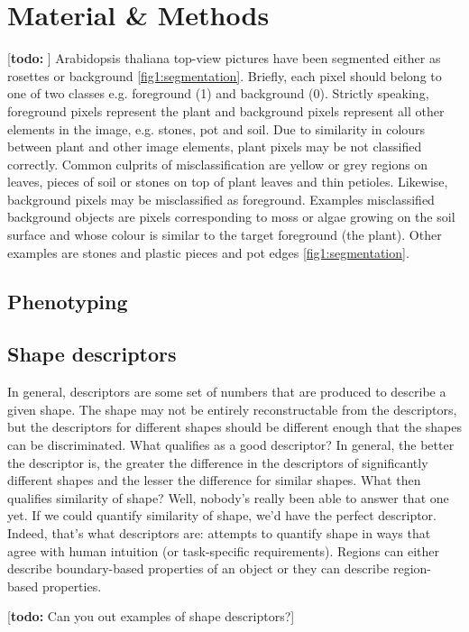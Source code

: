 \documentclass{frontiersSCNS} %
\newcommand{\todo}[1]{
  \rule{0pt}{0pt}\marginpar{{\color{blue}\rule{1ex}{1ex}}}
  {[\textbf{\color{blue}todo:} #1]}}
\begin{document}
\section{Material \& Methods}

\todo{}
Arabidopsis thaliana top-view pictures have been segmented either as rosettes or background \ref{fig1:segmentation}. Briefly, each pixel should belong to one of two classes e.g. foreground (1) and background (0). Strictly speaking, foreground pixels represent the plant and background pixels represent all other elements in the image, e.g. stones, pot and soil. Due to similarity in colours between plant and other image elements, plant pixels may be not classified correctly. Common culprits of misclassification are yellow or grey regions on leaves, pieces of soil or stones on top of plant leaves and thin petioles. Likewise, background pixels may be misclassified as foreground. Examples misclassified background objects are pixels corresponding to moss or algae growing on the soil surface and whose colour is similar to the target foreground (the plant). Other examples are stones and plastic pieces and pot edges \ref{fig1:segmentation}.

\subsection{Phenotyping}


\subsection{Shape descriptors}

In general, descriptors are some set of numbers that are produced to describe a given shape. The shape may not be
entirely reconstructable from the descriptors, but the descriptors for different shapes should be different enough that
the shapes can be discriminated.
What qualifies as a good descriptor? In general, the better the descriptor is, the greater the difference in the descriptors
of significantly different shapes and the lesser the difference for similar shapes. What then qualifies similarity
of shape? Well, nobody’s really been able to answer that one yet. If we could quantify similarity of shape, we’d have
the perfect descriptor. Indeed, that’s what descriptors are: attempts to quantify shape in ways that agree with human
intuition (or task-specific requirements). Regions can either describe boundary-based properties of an object or they can describe region-based properties. 
 \cite{}
\todo{Can you out examples of shape descriptors?}
\end{document}
